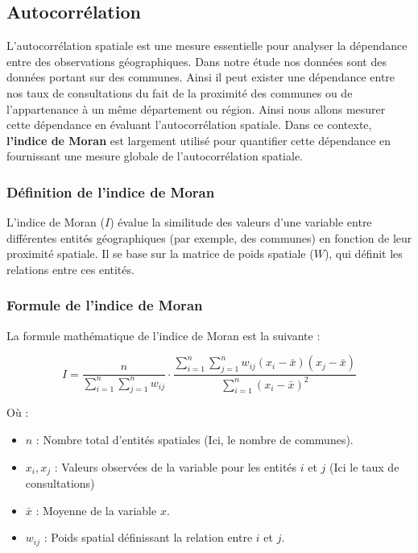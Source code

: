 \documentclass[
]{article}
\begin{document}
\subsection{Autocorrélation}\label{autocorruxe9lation}

L'autocorrélation spatiale est une mesure essentielle pour analyser la
dépendance entre des observations géographiques. Dans notre étude nos
données sont des données portant sur des communes. Ainsi il peut exister
une dépendance entre nos taux de consultations du fait de la proximité
des communes ou de l'appartenance à un même département ou région. Ainsi
nous allons mesurer cette dépendance en évaluant l'autocorrélation
spatiale. Dans ce contexte, \textbf{l'indice de Moran} est largement
utilisé pour quantifier cette dépendance en fournissant une mesure
globale de l'autocorrélation spatiale.

\subsubsection{Définition de l'indice de
Moran}\label{duxe9finition-de-lindice-de-moran}

L'indice de Moran (\(I\)) évalue la similitude des valeurs d'une
variable entre différentes entités géographiques (par exemple, des
communes) en fonction de leur proximité spatiale. Il se base sur la
matrice de poids spatiale (\(W\)), qui définit les relations entre ces
entités.

\subsubsection{Formule de l'indice de
Moran}\label{formule-de-lindice-de-moran}

La formule mathématique de l'indice de Moran est la suivante :

\[
I = \frac{n}{\sum_{i=1}^n \sum_{j=1}^n w_{ij}} \cdot \frac{\sum_{i=1}^n \sum_{j=1}^n w_{ij} (x_i - \bar{x})(x_j - \bar{x})}{\sum_{i=1}^n (x_i - \bar{x})^2}
\]

Où :

\begin{itemize}
\item
  \(n\) : Nombre total d'entités spatiales (Ici, le nombre de communes).
\item
  \(x_i, x_j\) : Valeurs observées de la variable pour les entités \(i\)
  et \(j\) (Ici le taux de consultations)
\item
  \(\bar{x}\) : Moyenne de la variable \(x\).
\item
  \(w_{ij}\) : Poids spatial définissant la relation entre \(i\) et
  \(j\).
\end{itemize}
\end{document}
